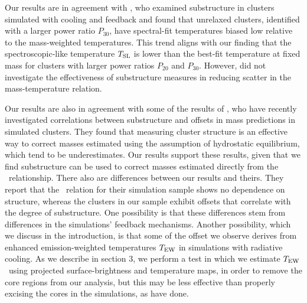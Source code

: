 \documentclass{aastex} \usepackage{natbib}
\begin{document}
Our results are in agreement with \cite{2006NewA...12...71V}, who
examined substructure in clusters simulated with cooling and feedback
and found that unrelaxed clusters, identified with a larger power
ratio $P_{30}$, have spectral-fit temperatures biased low relative to
the mass-weighted temperatures.  This trend aligns with our finding
that the spectroscopic-like temperature $T_{\rm SL}$ is lower than the
best-fit temperature at fixed mass for clusters with larger power
ratios $P_{20}$ and $P_{30}$.  However, \cite{2006NewA...12...71V} did
not investigate the effectiveness of substructure measures in reducing
scatter in the mass-temperature relation.

Our results are also in agreement with some of the results of
\cite{2007arXiv0708.1518J}, who have recently investigated
correlations between substructure and offsets in mass predictions in
simulated clusters.  They found that measuring cluster structure is an
effective way to correct masses estimated using the assumption of
hydrostatic equilibrium, which tend to be underestimates.  Our results
support these results, given that we find substructure can be used to
correct masses estimated directly from the \mtx\ relationship.  There
also are differences between our results and theirs.  They report that
the \mtx\ relation for their simulation sample shows no dependence on
structure, whereas the clusters in our sample exhibit offsets that
correlate with the degree of substructure.  One possibility is that
these differences stem from differences in the simulations' feedback
mechanisms.  Another possibility, which we discuss in the
introduction, is that some of the offset we observe derives from
enhanced emission-weighted temperatures $T_{\rm EW}$ in simulations with
radiative cooling.  As we describe in section 3, we perform a test in
which we estimate $T_{\rm EW}$\ using projected surface-brightness and
temperature maps, in order to remove the core regions from our
analysis, but this may be less effective than properly excising the
cores in the simulations, as \cite{2007arXiv0708.1518J} have done.
\end{document}
